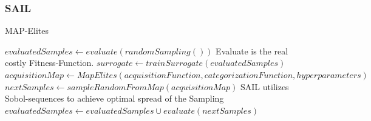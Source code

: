 
\subsubsection{SAIL}

\begin{algorithm}
	\caption{MAP-Elites} \label{alg:mapElites}
	\begin{algorithmic}[1]
\State $evaluatedSamples \gets evaluate(randomSampling())$ \Comment Evaluate is the real costly Fitness-Function.
\Else
\State $surrogate \gets trainSurrogate(evaluatedSamples)$
\State $acquisitionMap \gets MapElites(acquisitionFunction,categorizationFunction,hyperparameters)$
\State $nextSamples \gets sampleRandomFromMap(acquisitionMap)$ \Comment SAIL utilizes Sobol-sequences to achieve optimal spread of the Sampling
\State $evaluatedSamples \gets evaluatedSamples \cup evaluate(nextSamples)$
\EndIf
			\EndWhile
		\EndProcedure
	\end{algorithmic}
\end{algorithm}

